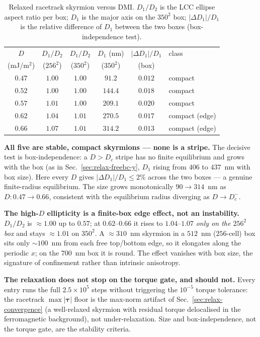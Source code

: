 \documentclass[11pt,a4paper]{article}
\newcommand{\mb}[1]{\mathbf{#1}}
\begin{document}
\begin{table}[H]
\centering
\begin{tabular}{c c c c c l}
\hline
$D$ & $D_1/D_2$ & $D_1/D_2$ & $D_1$ (nm) &
$|\Delta D_1|/D_1$ & class\\
(mJ/m$^2$) & ($256^2$) & ($350^2$) & ($350^2$) & (box) & \\
\hline
$0.47$ & $1.00$ & $1.00$ & $91.2$  & $0.012$ & compact\\
$0.52$ & $1.00$ & $1.00$ & $144.4$ & $0.018$ & compact\\
$0.57$ & $1.01$ & $1.00$ & $209.1$ & $0.020$ & compact\\
$0.62$ & $1.04$ & $1.01$ & $270.5$ & $0.017$ & compact (edge)\\
$0.66$ & $1.07$ & $1.01$ & $314.2$ & $0.013$ & compact (edge)\\
\hline
\end{tabular}
\caption{Relaxed racetrack skyrmion versus DMI. $D_1/D_2$ is the LCC
ellipse aspect ratio per box; $D_1$ is the major axis on the $350^2$
box; $|\Delta D_1|/D_1$ is the relative difference of $D_1$ between the
two boxes (box-independence test).}
\label{tab:dmi-sweep}
\end{table}

\textbf{All five are stable, compact skyrmions --- none is a stripe.}
The decisive test is box-independence: a $D>D_c$ stripe has no finite
equilibrium and grows with the box (as in Sec.~\ref{sec:relax-freebc-y},
$D_1$ rising from $406$ to $437$~nm with box size). Here every $D$ gives
$|\Delta D_1|/D_1 \le 2\%$ across the two boxes --- a genuine
finite-radius equilibrium. The size grows monotonically $90\to314$~nm as
$D:0.47\to0.66$, consistent with the equilibrium radius diverging as
$D\to D_c^-$.

\textbf{The high-$D$ ellipticity is a finite-box edge effect, not an
instability.} $D_1/D_2$ is $\approx 1.00$ up to $0.57$; at $0.62$--$0.66$
it rises to $1.04$--$1.07$ \emph{only on the $256^2$ box} and stays
$\approx 1.01$ on $350^2$. A $\approx 310$~nm skyrmion in a $512$~nm
($256$-cell) box sits only $\sim 100$~nm from each free top/bottom edge,
so it elongates along the periodic $x$; on the $700$~nm box it is round.
The effect vanishes with box size, the signature of confinement rather
than intrinsic anisotropy.

\textbf{The relaxation does not stop on the torque gate, and should not.}
Every entry runs the full $2.5\times10^{5}$ steps without triggering the
$10^{-5}$ torque tolerance: the racetrack $\max|\mb{\tau}|$ floor is the
max-norm artifact of Sec.~\ref{sec:relax-convergence} (a well-relaxed
skyrmion with residual torque delocalised in the ferromagnetic
background), not under-relaxation. Size and box-independence, not the
torque gate, are the stability criteria.
\end{document}
